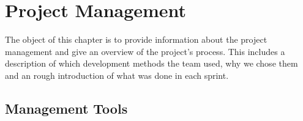 \chapter{Project Management}
The object of this chapter is to provide information about the project management and give an overview of the project's process. This includes a description of which development methods the team used, why we chose them and an rough introduction of what was done in each sprint.
\newpage
\section{Management Tools}




\newpage


\newpage

